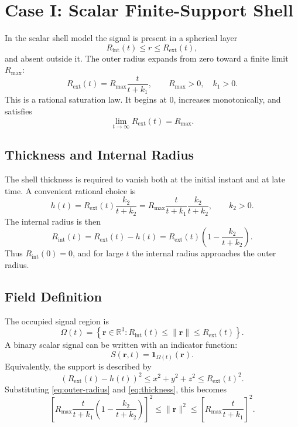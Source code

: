 \documentclass[a4paper,12pt]{article}
\begin{document}
\section{Case I: Scalar Finite-Support Shell}

In the scalar shell model the signal is present in a spherical layer
\[
    R_{\mathrm{int}}(t)\le r\le R_{\mathrm{ext}}(t),
\]
and absent outside it. The outer radius expands from zero toward a finite
limit \(R_{\max}\):
\begin{equation}
    R_{\mathrm{ext}}(t)
    =
    R_{\max}\frac{t}{t+k_1},
    \qquad
    R_{\max}>0,\quad k_1>0.
    \label{eq:outer-radius}
\end{equation}
This is a rational saturation law. It begins at \(0\), increases
monotonically, and satisfies
\[
    \lim_{t\to\infty}R_{\mathrm{ext}}(t)=R_{\max}.
\]

\subsection{Thickness and Internal Radius}

The shell thickness is required to vanish both at the initial instant and at
late time. A convenient rational choice is
\begin{equation}
    h(t)
    =
    R_{\mathrm{ext}}(t)\frac{k_2}{t+k_2}
    =
    R_{\max}\frac{t}{t+k_1}\frac{k_2}{t+k_2},
    \qquad k_2>0.
    \label{eq:thickness}
\end{equation}
The internal radius is then
\begin{equation}
    R_{\mathrm{int}}(t)
    =
    R_{\mathrm{ext}}(t)-h(t)
    =
    R_{\mathrm{ext}}(t)
    \left(1-\frac{k_2}{t+k_2}\right).
    \label{eq:internal-radius}
\end{equation}
Thus \(R_{\mathrm{int}}(0)=0\), and for large \(t\) the internal radius
approaches the outer radius.

\subsection{Field Definition}

The occupied signal region is
\[
    \Omega(t)
    =
    \left\{
        \bm{r}\in\mathbb{R}^3:
        R_{\mathrm{int}}(t)\le \|\bm{r}\|\le R_{\mathrm{ext}}(t)
    \right\}.
\]
A binary scalar signal can be written with an indicator function:
\begin{equation}
    S(\bm{r},t)
    =
    \mathbf{1}_{\Omega(t)}(\bm{r}).
    \label{eq:indicator-signal}
\end{equation}
Equivalently, the support is described by
\begin{equation}
    \left(R_{\mathrm{ext}}(t)-h(t)\right)^2
    \le
    x^2+y^2+z^2
    \le
    R_{\mathrm{ext}}(t)^2.
    \label{eq:shell-support}
\end{equation}
Substituting \eqref{eq:outer-radius} and \eqref{eq:thickness}, this becomes
\begin{equation}
    \left[
        R_{\max}\frac{t}{t+k_1}
        \left(1-\frac{k_2}{t+k_2}\right)
    \right]^2
    \le
    \|\bm{r}\|^2
    \le
    \left[
        R_{\max}\frac{t}{t+k_1}
    \right]^2.
    \label{eq:explicit-shell-support}
\end{equation}
\end{document}
